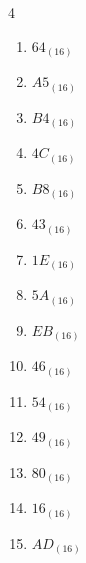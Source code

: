 \begin{multicols}{4}
\begin{enumerate}
        \phantom{$=45$}

  \item $64_{(16)}$

        \phantom{$=100$}

  \item $A5_{(16)}$

        \phantom{$=165$}

  \item $B4_{(16)}$

        \phantom{$=180$}

  \item $4C_{(16)}$

        \phantom{$=76$}

  \item $B8_{(16)}$

        \phantom{$=184$}

  \item $43_{(16)}$

        \phantom{$=67$}

  \item $1E_{(16)}$

        \phantom{$=30$}

  \item $5A_{(16)}$

        \phantom{$=90$}

  \item $EB_{(16)}$

        \phantom{$=235$}

  \item $46_{(16)}$

        \phantom{$=70$}

  \item $54_{(16)}$

        \phantom{$=84$}

  \item $49_{(16)}$

        \phantom{$=73$}

  \item $80_{(16)}$

        \phantom{$=128$}

  \item $16_{(16)}$

        \phantom{$=22$}

\columnbreak %

  \item $AD_{(16)}$

        \phantom{$=173$}


\end{enumerate}
\end{multicols}
